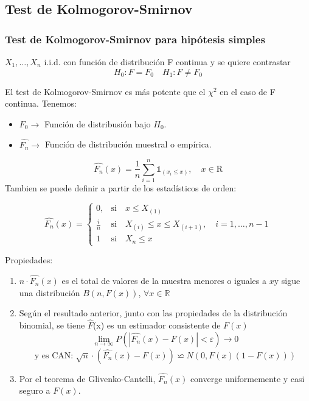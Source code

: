\subsection{Test de Kolmogorov-Smirnov}
\subsubsection{Test de Kolmogorov-Smirnov para hipótesis simples}

$X_1,\dots, X_n$ i.i.d. con función de distribución F continua y se quiere contrastar
\[
    H_0: F=F_0 \quad H_1: F \neq F_0
\]

El test de Kolmogorov-Smirnov es más potente que el $\chi^2$ en el caso de F continua.
Tenemos:
\begin{itemize}
    \item $F_0 \to $ Función de distribusión bajo $H_0$.
    \item $\widehat{F_n} \to$ Función de distribución muestral o empírica.
\end{itemize}
\[
    \widehat{F_n}(x)=\frac{1}{n} \sum_{i=1}^{n} \mathbb{1}_{(x_i \leq x)}, \quad x \in \mathrm{R}
\]
Tambien se puede definir a partir de los estadísticos de orden:

\[
    \widehat{F_n}(x)=
    \left\{
    \begin{array}{ll}
        0, & \text{si} \quad x \leq X_{(1)}\\
        \frac{i}{n} & \text{si} \quad X_{(i)} \leq x \leq X_{(i+1)}, \quad i=1, \dots,n-1 \\
        1 & \text{si} \quad X_n \leq x
    \end{array}
    \right.
\]
\newpage

Propiedades:
\begin{enumerate}
    \item $n\cdot \widehat{F_n}(x)$ es el total de valores de la muestra menores o iguales a $x$y sigue una distribución $B(n, F(x))$, $\forall x \in \mathbb{R}$
    \item Según el resultado anterior, junto con las propiedades de la distribución binomial, se tiene $\widehat{F}$(x) es un estimador consistente de $F(x)$
    \[
        \lim_{n \to \infty} P(|\widehat{F_n}(x) - F(x)| < \varepsilon) \to 0
    \]
    \[
        \text{y es CAN: }\sqrt{n}\cdot(\widehat{F_n}(x)-F(x))\backsimeq N(0,F(x)(1-F(x)))
    \]
    \item Por el teorema de Glivenko-Cantelli, $\widehat{F_n}(x)$ converge uniformemente y casi seguro a $F(x)$.
\end{enumerate}

